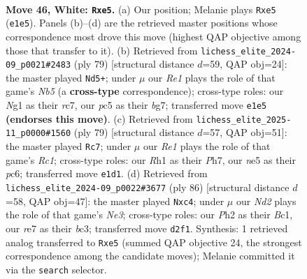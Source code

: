 \documentclass[11pt]{article}
\begin{document}
\clearpage

\begin{figure}[p]\centering
\begin{subfigure}{0.46\textwidth}\centering
\resizebox{\linewidth}{!}{%
\newchessgame
\chessboard[
  setfen={1r6/4r3/1pb4k/p1p1n3/8/2P2pP1/1K1N3P/4R1NR w - - 0 46},
  showmover=false,
  pgfstyle=straightmove, color=movearrow, markmove={e1-e5}
]}
\caption{}
\end{subfigure}\hfill
\begin{subfigure}{0.46\textwidth}\centering
\resizebox{\linewidth}{!}{%
\newchessgame
\chessboard[
  setfen={3rk3/1pR3Bp/8/pP6/rn2KPP1/3P4/3R3P/8 b - - 0 40},
  showmover=false,
  pgfstyle=straightmove, color=movearrow, markmove={b4-d5}
]}
\caption{}
\end{subfigure}
\\[4pt]
\begin{subfigure}{0.46\textwidth}\centering
\resizebox{\linewidth}{!}{%
\newchessgame
\chessboard[
  setfen={2r1k3/p5pp/2PR1p2/K3n3/1N6/1P4P1/P3r2P/2R5 b - - 10 40},
  showmover=false,
  pgfstyle=straightmove, color=movearrow, markmove={c8-c7}
]}
\caption{}
\end{subfigure}\hfill
\begin{subfigure}{0.46\textwidth}\centering
\resizebox{\linewidth}{!}{%
\newchessgame
\chessboard[
  setfen={3r2k1/6p1/p6p/8/2p1n3/2bpN1P1/P5KP/2BR4 w - - 0 44},
  showmover=false,
  pgfstyle=straightmove, color=movearrow, markmove={e3-c4}
]}
\caption{}
\end{subfigure}
\caption{\textbf{Move 46, White: \texttt{Rxe5}.} (a) Our position; Melanie plays \texttt{Rxe5} (\texttt{e1e5}). Panels (b)--(d) are the retrieved master positions whose correspondence most drove this move (highest QAP objective among those that transfer to it). (b) Retrieved from \texttt{lichess\_elite\_2024-09\_p0021\#2483} (ply 79) [structural distance $d$=59, QAP obj=24]: the master played \texttt{Nd5+}; under $\mu$ our \emph{Re1} plays the role of that game's \emph{Nb5} (a \textbf{cross-type} correspondence); cross-type roles: our \emph{N}g1 as their \emph{r}c7, our \emph{p}c5 as their \emph{b}g7; transferred move \texttt{e1e5} \textbf{(endorses this move)}. (c) Retrieved from \texttt{lichess\_elite\_2025-11\_p0000\#1560} (ply 79) [structural distance $d$=57, QAP obj=51]: the master played \texttt{Rc7}; under $\mu$ our \emph{Re1} plays the role of that game's \emph{Rc1}; cross-type roles: our \emph{R}h1 as their \emph{P}h7, our \emph{n}e5 as their \emph{p}c6; transferred move \texttt{e1d1}. (d) Retrieved from \texttt{lichess\_elite\_2024-09\_p0022\#3677} (ply 86) [structural distance $d$=58, QAP obj=47]: the master played \texttt{Nxc4}; under $\mu$ our \emph{Nd2} plays the role of that game's \emph{Ne3}; cross-type roles: our \emph{P}h2 as their \emph{B}c1, our \emph{r}e7 as their \emph{b}c3; transferred move \texttt{d2f1}. Synthesis: 1 retrieved analog transferred to \texttt{Rxe5} (summed QAP objective 24, the strongest correspondence among the candidate moves); Melanie committed it via the \texttt{search} selector.}
\label{fig:thought-m90}
\end{figure}
\end{document}
